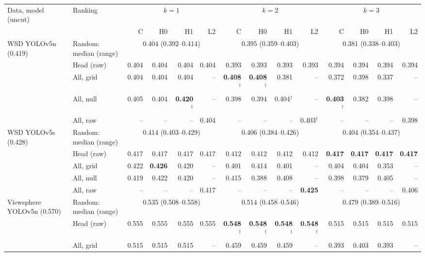 \begin{tabular}{llrrrrrrrrrrrr}
\toprule
Data, model (uncut) & Ranking & \multicolumn{4}{c}{$k=1$} & \multicolumn{4}{c}{$k=2$} & \multicolumn{4}{c}{$k=3$} \\
\cmidrule(lr){3-6}\cmidrule(lr){7-10}\cmidrule(lr){11-14}
 & & C & H0 & H1 & L2 & C & H0 & H1 & L2 & C & H0 & H1 & L2 \\
\midrule
WSD YOLOv5n (0.419) & Random: median (range) & \multicolumn{4}{c}{0.404 (0.392--0.414)} & \multicolumn{4}{c}{0.395 (0.359--0.403)} & \multicolumn{4}{c}{0.381 (0.338--0.403)} \\
 & Head (raw) & 0.404 & 0.404 & 0.404 & 0.404 & 0.393 & 0.393 & 0.393 & 0.393 & 0.394 & 0.394 & 0.394 & 0.394 \\
 & All, grid & 0.404 & 0.404 & 0.404 & -- & \textbf{0.408$^\dagger$} & \textbf{0.408$^\dagger$} & 0.381 & -- & 0.372 & 0.398 & 0.337 & -- \\
 & All, null & 0.405 & 0.404 & \textbf{0.420$^\dagger$} & -- & 0.398 & 0.394 & 0.404$^\dagger$ & -- & \textbf{0.403$^\dagger$} & 0.382 & 0.398 & -- \\
 & All, raw & -- & -- & -- & 0.404 & -- & -- & -- & 0.403$^\dagger$ & -- & -- & -- & 0.398 \\
\midrule
WSD YOLOv5s (0.428) & Random: median (range) & \multicolumn{4}{c}{0.414 (0.403--0.429)} & \multicolumn{4}{c}{0.406 (0.384--0.426)} & \multicolumn{4}{c}{0.404 (0.354--0.437)} \\
 & Head (raw) & 0.417 & 0.417 & 0.417 & 0.417 & 0.412 & 0.412 & 0.412 & 0.412 & \textbf{0.417} & \textbf{0.417} & \textbf{0.417} & \textbf{0.417} \\
 & All, grid & 0.422 & \textbf{0.426} & 0.420 & -- & 0.401 & 0.414 & 0.401 & -- & 0.404 & 0.404 & 0.353 & -- \\
 & All, null & 0.419 & 0.422 & 0.420 & -- & 0.415 & 0.388 & 0.408 & -- & 0.398 & 0.379 & 0.405 & -- \\
 & All, raw & -- & -- & -- & 0.417 & -- & -- & -- & \textbf{0.425} & -- & -- & -- & 0.406 \\
\midrule
Viewsphere YOLOv5n (0.570) & Random: median (range) & \multicolumn{4}{c}{0.535 (0.508--0.558)} & \multicolumn{4}{c}{0.514 (0.458--0.546)} & \multicolumn{4}{c}{0.479 (0.389--0.516)} \\
 & Head (raw) & 0.555 & 0.555 & 0.555 & 0.555 & \textbf{0.548$^\dagger$} & \textbf{0.548$^\dagger$} & \textbf{0.548$^\dagger$} & \textbf{0.548$^\dagger$} & 0.515 & 0.515 & 0.515 & 0.515 \\
 & All, grid & 0.515 & 0.515 & 0.515 & -- & 0.459 & 0.459 & 0.459 & -- & 0.393 & 0.403 & 0.393 & -- \\

\end{tabular}
